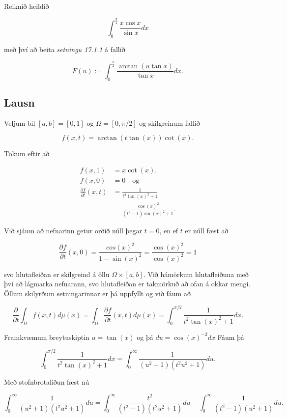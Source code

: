 \documentclass[]{book}
\begin{document}
Reiknið heildið

\[
\int_0^{\frac\pi 2} \frac{x\cos x}{\sin x}dx
\]

með því að beita \emph{setningu 17.1.1} á fallið

\[
F(u) := \int_0^{\frac\pi2}\frac{\arctan(u\tan x)}{\tan x}dx.
\]

\hypertarget{lausn-1}{%
\subsection*{Lausn}\label{lausn-1}}

Veljum bil \([a,b] = [0,1]\) og \(\Omega = [0,\pi/2]\) og skilgreinum fallið

\[
f(x,t) = \arctan(t\tan(x))\cot(x).
\]

Tökum eftir að

\[
\begin{aligned}
f(x,1) &= x\cot(x), \\
f(x,0) &= 0 \quad \text{og} \\
\frac{\partial f}{\partial t}(x,t) &= \frac{1}{t^2\tan(x)^2 + 1} \\
&=\frac{\cos(x)^2}{(t^2 - 1)\sin(x)^2 + 1}.
\end{aligned}
\]

Við sjáum að nefnarinn getur orðið núll þegar \(t = 0\), en ef \(t\) er núll fæst að

\[
\frac{\partial f}{\partial t}(x, 0) = \frac{cos(x)^2}{1 - \sin(x)^2} = \frac{\cos(x)^2}{\cos(x)^2} = 1
\]

svo hlutafleiðan er skilgreind á öllu \(\Omega\times[a,b]\). Við hámörkum hlutafleiðuna með því að lágmarka nefnarann, svo hlutafleiðan er takmörkuð að ofan á okkar mengi. Öllum skilyrðum setningarinnar er þá uppfyllt og við fáum að

\[
\frac{\partial}{\partial t}\int_\Omega f(x,t)d\mu(x) = 
\int_\Omega \frac{\partial f}{\partial t}(x,t)d\mu(x) =
\int_0^{\pi/2}\frac{1}{t^2\tan(x)^2 + 1}dx.
\]

Framkvæmum breytuskiptin \(u = \tan(x)\) og þá \(du = \cos(x)^{-2}dx\) Fáum þá

\[
\int_0^{\pi/2}\frac{1}{t^2\tan(x)^2 + 1}dx =
\int_0^\infty\frac{1}{(u^2+1)(t^2u^2+1)}du.
\]

Með stofnbrotaliðun fæst nú

\[
\int_0^\infty\frac{1}{(u^2+1)(t^2u^2+1)}du =
\int_0^\infty\frac{t^2}{(t^2 - 1)(t^2u^2+1)}du -
\int_0^\infty\frac{1}{(t^2-1)(u^2+1)}du.
\]
\end{document}
